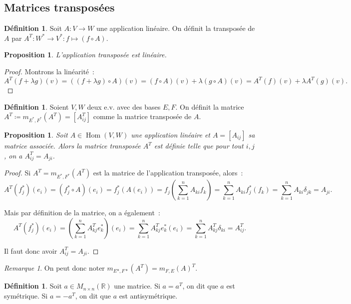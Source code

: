 \documentclass{article}
\DeclareMathOperator{\Hom}{Hom}
\newcommand{\R}{\mathbb R}
\newcommand{\M}[3]{M_{#1 \times #2}(#3)}
\newtheorem{prp}[thm]{Proposition}
\theoremstyle{definition}
\newtheorem{déf}[thm]{Définition}
\theoremstyle{remark}
\newtheorem*{rmq}{Remarque}
\begin{document}
	\subsection{Matrices transposées}
		\begin{déf} Soit $A : V \to W$ une application linéaire. On définit la transposée de $A$ par $A^T : W^* \to V^* : f \mapsto (f \circ A)$. \end{déf}

		\begin{prp} L'application transposée est linéaire. \end{prp}
		
		\begin{proof} Montrons la linéarité~:
		\[A^T(f+\lambda g)(v) = ((f+\lambda g) \circ A)(v) = (f \circ A)(v) + \lambda (g \circ A)(v) = A^T(f)(v) + \lambda A^T(g)(v).\]
		\end{proof}

		\begin{déf} Soient $V, W$ deux e.v. avec des bases $E, F$. On définit la matrice $A^T \coloneqq m_{E^*, F^*}(A^T)  = [A^T_{ij}]$ comme la matrice transposée
		de $A$. \end{déf}

		\begin{prp} Soit $A \in \Hom(V, W)$ une application linéaire et $A = [A_{ij}]$ sa matrice associée. Alors la matrice transposée $A^T$ est définie telle que
		pour tout $i, j$, on a $A^T_{ij} = A_{ji}$. \end{prp}

		\begin{proof} Si $A^T = m_{E^*, F^*}(A^T)$ est la matrice de l'application transposée, alors~: \[A^T(f_j^*)(e_i) = (f_j^* \circ A)(e_i) = f_j^*(A(e_i))
		= f_j\left(\sum_{k=1}^nA_{ki}f_k\right) = \sum_{k=1}^nA_{ki}f_j^*(f_k) = \sum_{k=1}^nA_{ki}\delta_{jk} = A_{ji}.\]

		Mais par définition de la matrice, on a également~: \[A^T(f_j^*)(e_i) = \left(\sum_{k=1}^nA^T_{kj}e_k^*\right)(e_i) = \sum_{k=1}^nA^T_{kj}e_k^*(e_i)
		= \sum_{k=1}^nA^T_{kj}\delta_{ki} = A^T_{ij}.\]

		Il faut donc avoir $A^T_{ij} = A_{ji}$. \end{proof}

		\begin{rmq} On peut donc noter $m_{E*, F*}(A^T) = m_{F, E}(A)^T$. \end{rmq}

		\begin{déf} Soit $a \in \M nn\R$ une matrice. Si $a=a^T$, on dit que $a$ est symétrique. Si $a=-a^T$, on dit que $a$ est antisymétrique. \end{déf}
\end{document}
